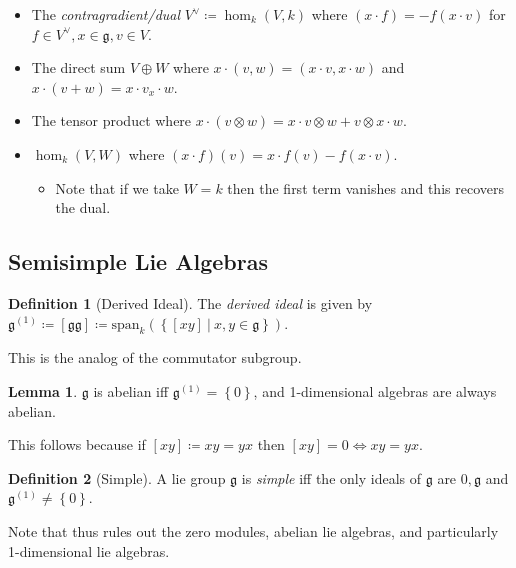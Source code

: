 \documentclass[11pt]{scrartcl}
\theoremstyle{definition}
\theoremstyle{theorem}
\newtheorem{lemma}[theorem]{Lemma}
\theoremstyle{proof}
\theoremstyle{definition}
\newtheorem{definition}{Definition}[theorem]
\theoremstyle{break}
\theoremstyle{problem}
\providecommand{\tightlist}{%
  \setlength{\itemsep}{0pt}\setlength{\parskip}{0pt}}
\DeclarePairedDelimiter\qty{(}{)}
\renewcommand{\qty}[1]{{\left(  {#1} \right)}}
\newcommand{\definedas}[0]{\coloneqq}
\newcommand{\dual}[0]{^\vee}
\newcommand{\lieg}[0]{{\mathfrak{g}}}
\newcommand{\spanof}[0]{{\mathrm{span}}}
\newcommand{\suchthat}[0]{{~\mathrel{\Big|}~}}
\newcommand{\tensor}[0]{\otimes}
\newcommand{\theset}[1]{\left\{{#1}\right\}}
\begin{document}
\begin{itemize}
\item
  The \emph{contragradient/dual} \(V\dual \definedas \hom_k(V, k)\)
  where \((x\cdot f) = -f(x\cdot v)\) for
  \(f\in V\dual, x\in \lieg, v\in V\).
\item
  The direct sum \(V\oplus W\) where
  \(x\cdot(v, w) = (x\cdot v, x\cdot w)\) and
  \(x\cdot (v+w) = x\cdot v _ x\cdot w\).
\item
  The tensor product where
  \(x\cdot(v\tensor w) = x\cdot v \tensor w + v\tensor x\cdot w\).
\item
  \(\hom_k(V, W)\) where \((x\cdot f)(v) = x\cdot f(v) - f(x\cdot v)\).

  \begin{itemize}
  \tightlist
  \item
    Note that if we take \(W=k\) then the first term vanishes and this
    recovers the dual.
  \end{itemize}
\end{itemize}

\hypertarget{semisimple-lie-algebras}{%
\subsection{Semisimple Lie Algebras}\label{semisimple-lie-algebras}}

\begin{definition}[Derived Ideal]

The \emph{derived ideal} is given by
\(\lieg^{(1)} \definedas [\lieg \lieg] \definedas \spanof_k\qty{\theset{[x y] \suchthat x,y\in\lieg }}\).\end{definition}

This is the analog of the commutator subgroup.

\begin{lemma}

\(\lieg\) is abelian iff \(\lieg^{(1)} = \theset{0}\), and 1-dimensional
algebras are always abelian.\end{lemma}

This follows because if \([x y] \definedas xy = yx\) then
\([x y] = 0 \iff xy = yx\).

\begin{definition}[Simple]

A lie group \(\lieg\) is \emph{simple} iff the only ideals of \(\lieg\)
are \(0, \lieg\) and \(\lieg^{(1)} \neq \theset{0}\).\end{definition}

Note that thus rules out the zero modules, abelian lie algebras, and
particularly 1-dimensional lie algebras.
\end{document}
